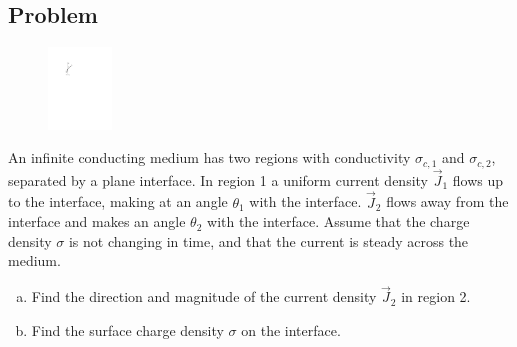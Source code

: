 \documentclass[solutions]{esg8022pset}
\begin{document}
\subsection{Problem}
  \begin{figure}\vspace{-5\intextsep}
    \begin{center}\includegraphics[width=0.15\textwidth]{ps06_07_01}\end{center}
  \end{figure}
  An infinite conducting medium has two regions with conductivity $\sigma_{c,1}$ and $\sigma_{c,2}$, separated by a plane interface. In
  region 1 a uniform current density $\vec J_1$ flows up to the interface, making at an angle $\theta_1$ with the interface. $\vec J_2$ flows away from the interface and makes an angle $\theta_2$ with the interface. Assume that the charge density $\sigma$ is not changing in time, and that the current is steady across the medium.
  \begin{enumerate}[(a)]
    \item Find the direction and magnitude of the current density $\vec J_2$ in region 2.
    \item Find the surface charge density $\sigma$ on the interface.
  \end{enumerate}
\end{document}

